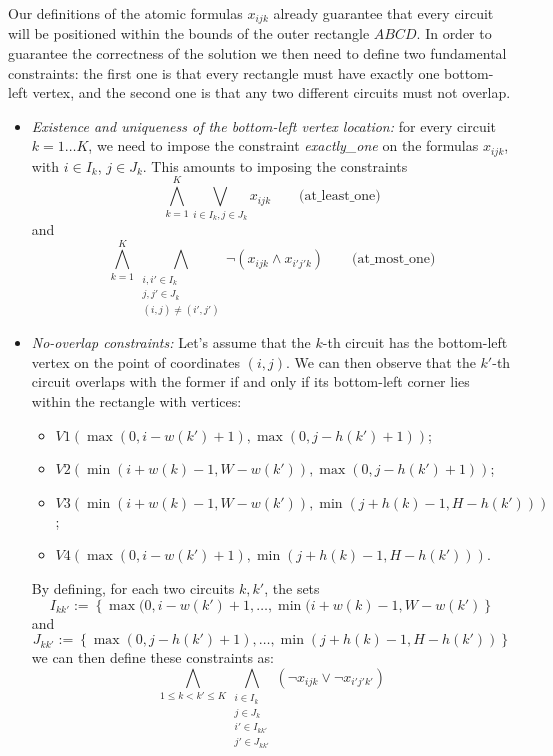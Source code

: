 \documentclass[]{article}
\begin{document}
Our definitions of the atomic formulas $x_{ijk}$ already guarantee that every circuit will be positioned within the bounds of the outer rectangle $ABCD$. In order to guarantee the correctness of the solution we then need to define two fundamental constraints: the first one is that every rectangle must have exactly one bottom-left vertex, and the second one is that any two different circuits must not overlap. 
\begin{itemize}
	\item \emph{Existence and uniqueness of the bottom-left vertex location:} for every circuit $k=1 \dots K$, we need to impose the constraint
	\emph{exactly\_one} on the formulas $x_{ijk}$, with $i\in I_k$, $j \in J_k$. This amounts to imposing the constraints \begin{equation*}\bigwedge_{k=1}^{K} \bigvee_{i\in I_k, j\in J_k} x_{ijk}\qquad \text{(at\_least\_one)}\end{equation*} and \begin{equation*}\bigwedge_{k=1}^{K} \bigwedge_{\substack{i,i'\in I_k \\ j,j'\in J_k \\ (i,j) \neq (i',j')}} \neg(x_{ijk}\wedge x_{i'j'k}) \qquad \text{(at\_most\_one)}\end{equation*}
	\item \emph{No-overlap constraints:} Let's assume that the $k$-th circuit has the bottom-left vertex on the point of coordinates $(i,j)$. We can then observe that the $k'$-th circuit overlaps with the former if and only if its bottom-left corner lies within the rectangle with vertices:
	\begin{itemize}
		\item $V1(\max(0, i-w(k')+1), \max(0, j-h(k')+1))$;
		\item $V2(\min(i+w(k)-1, W-w(k')), \max (0, j-h(k')+1))$;
		\item $V3(\min(i+w(k)-1, W-w(k')), \min(j+h(k)-1, H-h(k')))$;
		\item $V4(\max(0, i-w(k')+1), \min(j+h(k)-1, H-h(k')))$.
	\end{itemize}
	By defining, for each two circuits $k, k'$, the sets \begin{equation*}I_{kk'}:=\left\{\max(0, i-w(k')+1, \dots, \min(i+w(k)-1, W-w(k')\right\}\end{equation*} and 
	\begin{equation*}J_{kk'}:=\left\{\max(0, j-h(k')+1), \dots, \min(j+h(k)-1, H-h(k'))\right\}\end{equation*}
	we can then define these constraints as:
	\begin{equation*}\bigwedge_{1\leq k<k'\leq K} \bigwedge_{\substack{i \in I_k \\ j \in J_k \\ i'\in I_{kk'} \\ j' \in J_{kk'}}} \left(\neg x_{ijk} \lor \neg x_{i'j'k'}\right)\end{equation*}
\end{itemize}
\end{document}
